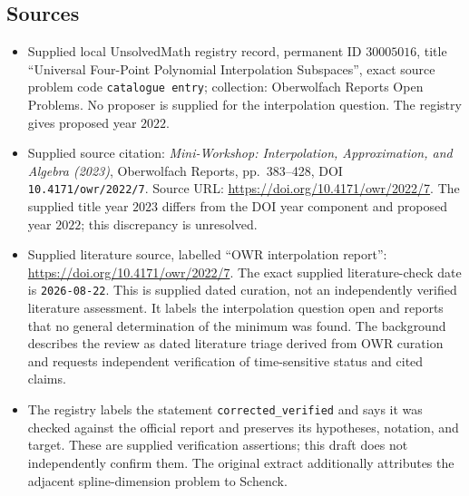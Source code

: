 \documentclass[11pt]{article}
\begin{document}
\subsection{Sources}
\begin{itemize}
\item Supplied local UnsolvedMath registry record, permanent ID \(30005016\), title ``Universal Four-Point Polynomial Interpolation Subspaces'', exact source problem code \texttt{catalogue entry}; collection: Oberwolfach Reports Open Problems. No proposer is supplied for the interpolation question. The registry gives proposed year \(2022\).
\item Supplied source citation: \emph{Mini-Workshop: Interpolation, Approximation, and Algebra (2023)}, Oberwolfach Reports, pp.~383--428, DOI \texttt{10.4171/owr/2022/7}. Source URL: \url{https://doi.org/10.4171/owr/2022/7}. The supplied title year \(2023\) differs from the DOI year component and proposed year \(2022\); this discrepancy is unresolved.
\item Supplied literature source, labelled ``OWR interpolation report'': \url{https://doi.org/10.4171/owr/2022/7}. The exact supplied literature-check date is \texttt{2026-08-22}. This is supplied dated curation, not an independently verified literature assessment. It labels the interpolation question open and reports that no general determination of the minimum was found. The background describes the review as dated literature triage derived from OWR curation and requests independent verification of time-sensitive status and cited claims.
\item The registry labels the statement \texttt{corrected\_verified} and says it was checked against the official report and preserves its hypotheses, notation, and target. These are supplied verification assertions; this draft does not independently confirm them. The original extract additionally attributes the adjacent spline-dimension problem to Schenck.
\end{itemize}
\end{document}
